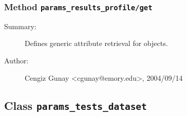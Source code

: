 \subsubsection[Method \texttt{get}]{Method \texttt{params\_results\_profile/get}}%
%
\label{ref_params_results_profile__get}%
\hypertarget{ref_params_results_profile__get}{}%
\begin{description}
\item[Summary:]Defines generic attribute retrieval for objects.
%
%
%
%
%
%
%
\item[Author:]%
Cengiz Gunay <cgunay@emory.edu>, 2004/09/14
%
\end{description}
\methodline%
\subsection{Class \texttt{params\_tests\_dataset}}%
%
\label{ref_params_tests_dataset}%
\hypertarget{ref_params_tests_dataset}{}%
